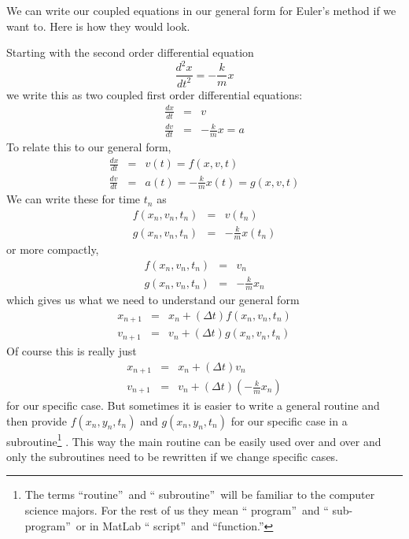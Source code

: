 \documentclass[twoside,11pt,ShortChapTitles]{BYUTextbook}
\begin{document}
We can write our coupled equations in our general form for Euler's method if
we want to. Here is how they would look.

Starting with the second order differential equation 
\[
\frac{d^{2}x}{dt^{2}}=-\frac{k}{m}x 
\]%
we write this as two coupled first order differential equations: 
\begin{eqnarray*}
\frac{dx}{dt} &=&v \\
\frac{dv}{dt} &=&-\frac{k}{m}x=a
\end{eqnarray*}%
To relate this to our general form, 
\begin{eqnarray*}
\frac{dx}{dt} &=&v(t)=f(x,v,t) \\
\frac{dv}{dt} &=&a(t)=-\frac{k}{m}x\left( t\right) =g(x,v,t)
\end{eqnarray*}%
We can write these for time $t_{n}$ as%
\begin{eqnarray*}
f(x_{n},v_{n},t_{n}) &=&v(t_{n}) \\
g(x_{n},v_{n},t_{n}) &=&-\frac{k}{m}x\left( t_{n}\right)
\end{eqnarray*}%
or more compactly,%
\begin{eqnarray*}
f(x_{n},v_{n},t_{n}) &=&v_{n} \\
g(x_{n},v_{n},t_{n}) &=&-\frac{k}{m}x_{n}
\end{eqnarray*}%
which gives us what we need to understand our general form%
\begin{eqnarray*}
x_{n+1} &=&x_{n}+(\Delta t)f(x_{n},v_{n},t_{n}) \\
v_{n+1} &=&v_{n}+(\Delta t)g(x_{n},v_{n},t_{n})
\end{eqnarray*}%
Of course this is really just 
\begin{eqnarray*}
x_{n+1} &=&x_{n}+(\Delta t)v_{n} \\
v_{n+1} &=&v_{n}+(\Delta t)\left( -\frac{k}{m}x_{n}\right)
\end{eqnarray*}%
for our specific case. But sometimes it is easier to write a general routine
and then provide $f(x_{n},y_{n},t_{n})$ and $g(x_{n},y_{n},t_{n})$ for our
specific case in a subroutine\footnote{%
The terms \textquotedblleft routine\textquotedblright\ and \textquotedblleft
subroutine\textquotedblright\ will be familiar to the computer science
majors. For the rest of us they mean \textquotedblleft
program\textquotedblright\ and \textquotedblleft
sub-program\textquotedblright\ or in MatLab \textquotedblleft
script\textquotedblright\ and \textquotedblleft function.\textquotedblright}%
. This way the main routine can be easily used over and over and only the
subroutines need to be rewritten if we change specific cases.
\end{document}
